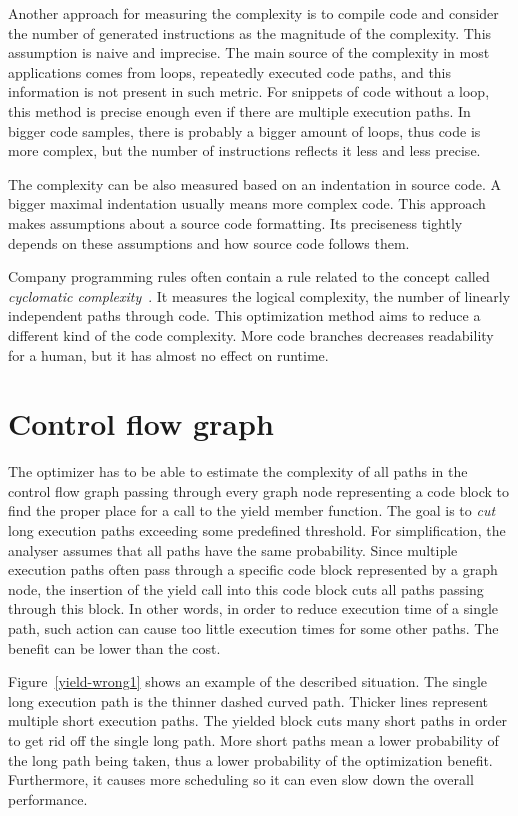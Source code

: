 Another approach for measuring the complexity is to compile code and consider the number of generated instructions as the magnitude of the complexity. This assumption is naive and imprecise. The main source of the complexity in most applications comes from loops, repeatedly executed code paths, and this information is not present in such metric. For snippets of code without a loop, this method is precise enough even if there are multiple execution paths. In bigger code samples, there is probably a bigger amount of loops, thus code is more complex, but the number of instructions reflects it less and less precise.

The complexity can be also measured based on an indentation in source code. A bigger maximal indentation usually means more complex code. This approach makes assumptions about a source code formatting. Its preciseness tightly depends on these assumptions and how source code follows them.

Company programming rules often contain a rule related to the concept called \emph{cyclomatic complexity}~\cite{cyclomatic-complexity}. It measures the logical complexity, the number of linearly independent paths through code. This optimization method aims to reduce a different kind of the code complexity. More code branches decreases readability for a human, but it has almost no effect on runtime.

\section{Control flow graph}
\label{yield-cfg}
The optimizer has to be able to estimate the complexity of all paths in the control flow graph passing through every graph node representing a code block to find the proper place for a call to the yield member function. The goal is to \textit{cut} long execution paths exceeding some predefined threshold. For simplification, the analyser assumes that all paths have the same probability. Since multiple execution paths often pass through a specific code block represented by a graph node, the insertion of the yield call into this code block cuts all paths passing through this block. In other words, in order to reduce execution time of a single path, such action can cause too little execution times for some other paths. The benefit can be lower than the cost.

Figure~\ref{yield-wrong1} shows an example of the described situation. The single long execution path is the thinner dashed curved path. Thicker lines represent multiple short execution paths. The yielded block cuts many short paths in order to get rid off the single long path. More short paths mean a lower probability of the long path being taken, thus a lower probability of the optimization benefit. Furthermore, it causes more scheduling so it can even slow down the overall performance.

